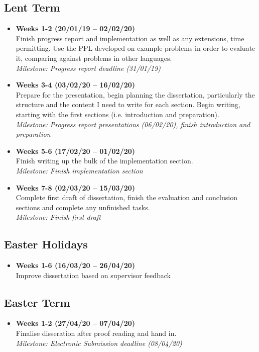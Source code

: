 \subsection*{Lent Term}
\begin{itemize}
	\item \textbf{Weeks 1-2 (20/01/19 -- 02/02/20)}\\ Finish progress report and implementation as well as any extensions, time permitting. Use the PPL developed on example problems in order to evaluate it, comparing against problems in other languages.
	      \\ \textit{Milestone: Progress report deadline (31/01/19)}
	\item \textbf{Weeks 3-4 (03/02/20 -- 16/02/20)}\\ Prepare for the presentation, begin planning the dissertation, particularly the structure and the content I need to write for each section. Begin writing, starting with the first sections (i.e. introduction and preparation).
	      \\ \textit{Milestone: Progress report presentations (06/02/20), finish introduction and preparation}
	\item \textbf{Weeks 5-6 (17/02/20 -- 01/02/20)}\\ Finish writing up the bulk of the implementation section.
	      \\ \textit{Milestone: Finish implementation section}
	\item \textbf{Weeks 7-8 (02/03/20 -- 15/03/20)}\\ Complete first draft of dissertation, finish the evaluation and conclusion sections and complete any unfinished tasks.
	      \\ \textit{Milestone: Finish first draft}
\end{itemize}
\subsection*{Easter Holidays}
\begin{itemize}
	\item \textbf{Weeks 1-6 (16/03/20 -- 26/04/20)}\\ Improve dissertation based on supervisor feedback
\end{itemize}
\subsection*{Easter Term}
\begin{itemize}
	\item \textbf{Weeks 1-2 (27/04/20 -- 07/04/20)}\\ Finalise disseration after proof reading and hand in.
	      \\ \textit{Milestone: Electronic Submission deadline (08/04/20)}
\end{itemize}

